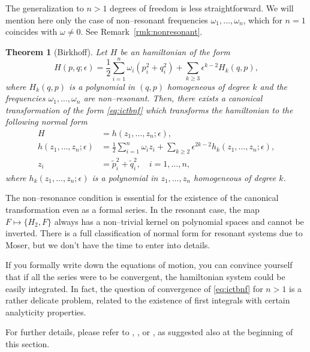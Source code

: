 \documentclass[english,fontsize=11pt,paper=b5]{scrbook}
\numberwithin{equation}{chapter}
\newtheorem{theorem}{Theorem}[chapter]
\theoremstyle{definition}
\begin{document}
      The generalization to $n>1$ degrees of freedom is less straightforward. We will mention here only the case of non--resonant frequencies $\omega_1,\ldots,\omega_n$, which for $n=1$ coincides with $\omega \neq 0$. See Remark~\ref{rmk:nonresonant}.

      \begin{theorem}[Birkhoff]
        Let $H$ be an hamiltonian of the form
        \begin{equation}
          H(p,q; \epsilon) = \frac12 \sum_{i=1}^n \omega_i(p_i^2 + q_i^2) + \sum_{k\geq 3} \epsilon^{k-2} H_k(q,p),
        \end{equation}
        where $H_k(q,p)$ is a polynomial in $(q,p)$ homogeneous of degree $k$ and the frequencies $\omega_1,\ldots,\omega_n$ are non--resonant.
        Then, there exists a canonical transformation of the form \eqref{eq:ictbnf} which transforms the hamiltonian to the following normal form
        \begin{align}
          H                          & = h(z_1, \ldots, z_n; \epsilon),                                                                      \\
          h(z_1,\ldots,z_n;\epsilon) & = \frac12 \sum_{i=1}^n \omega_i z_i + \sum_{k\geq 2} \epsilon^{2k-2} h_k(z_1, \ldots, z_n; \epsilon), \\
          z_i                        & = \widetilde p_i^2 + \widetilde q_i^2,\quad i=1,\ldots,n,
        \end{align}
        where $h_k(z_1, \ldots, z_n; \epsilon)$ is a polynomial in $z_1, \ldots, z_n$ homogeneous of degree $k$.
      \end{theorem}

      The non--resonance condition is essential for the existence of the canonical transformation even as a formal series. In the resonant case, the map $F \mapsto \big\{H_2, F\big\}$ always has a non--trivial kernel on polynomial spaces and cannot be inverted.
      There is a full classification of normal form for resonant systems due to Moser, but we don't have the time to enter into details.

      If you formally write down the equations of motion, you can convince yourself that if all the series were to be convergent, the hamiltonian system could be easily integrated.
      In fact, the question of convergence of \eqref{eq:ictbnf} for $n>1$ is a rather delicate problem, related to the existence of first integrals with certain analyticity properties.

      For further details, please refer to \cite{Broer_2009}, \cite[Chapter 6.5]{book:celletti}, \cite[Chapter 8.3]{book:arnoldcelestial} or \cite[Chapters 15.2 and 15.3]{book:knauf}, as suggested also at the beginning of this section.
\end{document}
